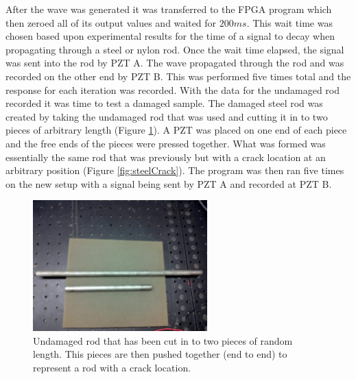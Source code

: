 After the wave was generated it was transferred to the FPGA program which then zeroed all of its output values and waited for $200ms$. This wait time was chosen based upon experimental results for the time of a signal to decay when propagating through a steel or nylon rod. Once the wait time elapsed, the signal was sent into the rod by PZT A. The wave propagated through the rod and was recorded on the other end by PZT B. This was performed five times total and the response for each iteration was recorded. With the data for the undamaged rod recorded it was time to test a damaged sample. The damaged steel rod was created  by taking the undamaged rod that was used and cutting it in to two pieces of arbitrary length (Figure \ref{fig:steelPieces}). A PZT was placed on one end of each piece and the free ends of the pieces were pressed together. What was formed was essentially the same rod that was previously but with a crack location at an arbitrary position (Figure \ref{fig:steelCrack}). The program was then ran five times on the new setup with a signal being sent by PZT A and recorded at PZT B.

\begin{figure}[ht!]
\centering
\includegraphics[width=0.6\textwidth]{eps_pics/steelPieces}
\caption{Undamaged rod that has been cut in to two pieces of random length. This pieces are then pushed together (end to end) to represent a rod with a crack location.
 	 \label{fig:steelPieces}} 
\end{figure}

